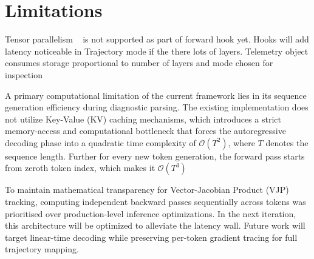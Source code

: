 \documentclass[10pt,conference]{IEEEtran}
\begin{document}
\section{Limitations}
Tensor parallelism ~\cite{santopaolo2026tensor} is not supported as part of forward hook yet. Hooks will add latency noticeable in Trajectory mode if the there lots of layers. Telemetry object consumes storage proportional to number of layers and mode chosen for inspection

A primary computational limitation of the current framework lies in its sequence generation efficiency during diagnostic parsing. The existing implementation does not utilize Key-Value (KV) caching mechanisms, which introduces a strict memory-access and computational bottleneck that forces the autoregressive decoding phase into a quadratic time complexity of $\mathcal{O}(T^2)$, where $T$ denotes the sequence length. Further for every new token generation, the forward pass starts from zeroth token index, which makes it $\mathcal{O}(T^3)$

To maintain mathematical transparency for Vector-Jacobian Product (VJP) tracking, computing independent backward passes sequentially across tokens was prioritised over production-level inference optimizations. In the next iteration, this architecture will be optimized to alleviate the latency wall. Future work will target linear-time decoding while preserving per-token gradient tracing for full trajectory mapping.
\end{document}
